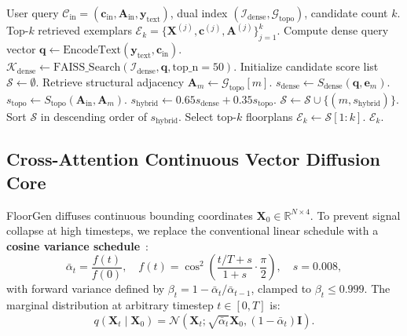 \documentclass[journal]{IEEEtran}
\begin{document}
\begin{algorithm}[!t]
\caption{Hybrid Vector-Graph Retrieval ($\mathcal{R}$)}
\label{alg:retrieval}
\begin{algorithmic}[1]
\REQUIRE User query $\mathcal{C}_{\mathrm{in}} = (\mathbf{c}_{\mathrm{in}}, \mathbf{A}_{\mathrm{in}}, \mathbf{y}_{\mathrm{text}})$, dual index $(\mathcal{I}_{\mathrm{dense}}, \mathcal{G}_{\mathrm{topo}})$, candidate count $k$.
\ENSURE Top-$k$ retrieved exemplars $\mathcal{E}_k = \{\mathbf{X}^{(j)}, \mathbf{c}^{(j)}, \mathbf{A}^{(j)}\}_{j=1}^k$.
\STATE Compute dense query vector $\mathbf{q} \leftarrow \mathrm{EncodeText}(\mathbf{y}_{\mathrm{text}}, \mathbf{c}_{\mathrm{in}})$.
\STATE $\mathcal{K}_{\mathrm{dense}} \leftarrow \mathrm{FAISS\_Search}(\mathcal{I}_{\mathrm{dense}}, \mathbf{q}, \mathrm{top\_n}=50)$.
\STATE Initialize candidate score list $\mathcal{S} \leftarrow \emptyset$.
    \STATE Retrieve structural adjacency $\mathbf{A}_m \leftarrow \mathcal{G}_{\mathrm{topo}}[m]$.
    \STATE $s_{\mathrm{dense}} \leftarrow S_{\mathrm{dense}}(\mathbf{q}, \mathbf{e}_m)$.
    \STATE $s_{\mathrm{topo}} \leftarrow S_{\mathrm{topo}}(\mathbf{A}_{\mathrm{in}}, \mathbf{A}_m)$.
    \STATE $s_{\mathrm{hybrid}} \leftarrow 0.65 s_{\mathrm{dense}} + 0.35 s_{\mathrm{topo}}$.
    \STATE $\mathcal{S} \leftarrow \mathcal{S} \cup \{(m, s_{\mathrm{hybrid}})\}$.
\ENDFOR
\STATE Sort $\mathcal{S}$ in descending order of $s_{\mathrm{hybrid}}$.
\STATE Select top-$k$ floorplans $\mathcal{E}_k \leftarrow \mathcal{S}[1:k]$.
\RETURN $\mathcal{E}_k$.
\end{algorithmic}
\end{algorithm}

\subsection{Cross-Attention Continuous Vector Diffusion Core}
FloorGen diffuses continuous bounding coordinates $\mathbf{X}_0 \in \mathbb{R}^{N \times 4}$. To prevent signal collapse at high timesteps, we replace the conventional linear schedule with a \textbf{cosine variance schedule}~\cite{nichol2021improved}:
\begin{equation}
\bar{\alpha}_t = \frac{f(t)}{f(0)}, \quad f(t) = \cos^2\left(\frac{t/T + s}{1 + s} \cdot \frac{\pi}{2}\right), \quad s = 0.008,
\end{equation}
with forward variance defined by $\beta_t = 1 - \bar{\alpha}_t / \bar{\alpha}_{t-1}$, clamped to $\beta_t \le 0.999$. The marginal distribution at arbitrary timestep $t \in [0, T]$ is:
\begin{equation}
q(\mathbf{X}_t \mid \mathbf{X}_0) = \mathcal{N}\left(\mathbf{X}_t; \sqrt{\bar{\alpha}_t}\mathbf{X}_0, (1 - \bar{\alpha}_t)\mathbf{I}\right).
\end{equation}
\end{document}
